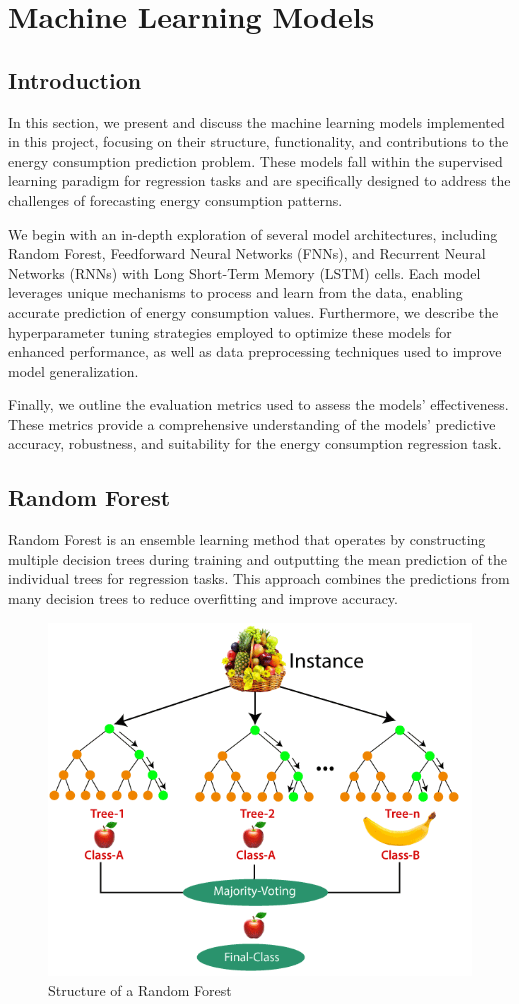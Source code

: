\section{Machine Learning Models}
\label{sec:ML_Models}
\subsection{Introduction}
In this section, we present and discuss the machine learning models implemented in this project, focusing on their structure, functionality, and contributions to the energy consumption prediction problem. These models fall within the supervised learning paradigm for regression tasks and are specifically designed to address the challenges of forecasting energy consumption patterns.

We begin with an in-depth exploration of several model architectures, including Random Forest, Feedforward Neural Networks (FNNs), and Recurrent Neural Networks (RNNs) with Long Short-Term Memory (LSTM) cells. Each model leverages unique mechanisms to process and learn from the data, enabling accurate prediction of energy consumption values. Furthermore, we describe the hyperparameter tuning strategies employed to optimize these models for enhanced performance, as well as data preprocessing techniques used to improve model generalization.

Finally, we outline the evaluation metrics used to assess the models' effectiveness. These metrics provide a comprehensive understanding of the models' predictive accuracy, robustness, and suitability for the energy consumption regression task.


\subsection{Random Forest}
Random Forest is an ensemble learning method that operates by constructing multiple decision trees during training and outputting the mean prediction of the individual trees for regression tasks. This approach combines the predictions from many decision trees to reduce overfitting and improve accuracy.

\begin{figure}[h!]
    \centering
    \includegraphics[width=0.8\linewidth]{images/rf_struture.png}
    \caption{Structure of a Random Forest}
    \label{fig:feedforward_structure}
\end{figure}

